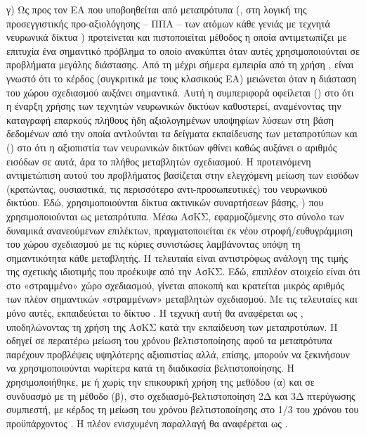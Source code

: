 	γ) Ως προς τον ΕΑ που υποβοηθείται από μεταπρότυπα (, στη λογική της προσεγγιστικής προ-αξιολόγησης – ΠΠΑ – των ατόμων κάθε γενιάς με τεχνητά νευρωνικά δίκτυα \cite{LTT_2_018,LTT_2_020,LTT_2_029}) προτείνεται και πιστοποιείται μέθοδος η οποία αντιμετωπίζει με επιτυχία ένα σημαντικό πρόβλημα το οποίο ανακύπτει όταν αυτές χρησιμοποιούνται σε προβλήματα μεγάλης διάστασης. Από τη μέχρι σήμερα εμπειρία από τη χρήση , είναι γνωστό ότι το κέρδος (συγκριτικά με τους κλασικούς ΕΑ) μειώνεται όταν η διάσταση του χώρου σχεδιασμού αυξάνει σημαντικά. Αυτή η συμπεριφορά οφείλεται () στο ότι η έναρξη χρήσης των τεχνητών νευρωνικών δικτύων καθυστερεί, αναμένοντας την καταγραφή επαρκούς πλήθους ήδη αξιολογημένων υποψηφίων λύσεων στη βάση δεδομένων από την οποία αντλούνται τα δείγματα εκπαίδευσης των μεταπροτύπων και () στο ότι η αξιοπιστία των νευρωνικών δικτύων φθίνει καθώς αυξάνει ο αριθμός εισόδων σε αυτά, άρα το πλήθος μεταβλητών σχεδιασμού. Η προτεινόμενη αντιμετώπιση αυτού του προβλήματος βασίζεται στην ελεγχόμενη μείωση των εισόδων (κρατώντας, ουσιαστικά, τις περισσότερο αντι-προσωπευτικές) του νευρωνικού δικτύου. Εδώ, χρησιμοποιούνται δίκτυα ακτινικών συναρτήσεων βάσης, \cite{Haykin}) που χρησιμοποιούνται  ως μεταπρότυπα.  Μέσω ΑσΚΣ, εφαρμοζόμενης στο σύνολο των δυναμικά ανανεούμενων επιλέκτων, πραγματοποιείται εκ νέου στροφή/ευθυγράμμιση του χώρου σχεδιασμού με τις κύριες συνιστώσες λαμβάνοντας υπόψη τη σημαντικότητα κάθε μεταβλητής. Η τελευταία είναι αντιστρόφως ανάλογη της τιμής της σχετικής ιδιοτιμής που προέκυψε από την ΑσΚΣ. Εδώ, επιπλέον στοιχείο είναι ότι στο «στραμμένο» χώρο σχεδιασμού, γίνεται αποκοπή και κρατείται μικρός αριθμός των πλέον σημαντικών «στραμμένων» μεταβλητών σχεδιασμού. Με τις τελευταίες και μόνο αυτές, εκπαιδεύεται το δίκτυο . Η τεχνική αυτή θα αναφέρεται ως , υποδηλώνοντας τη χρήση της ΑσΚΣ κατά την εκπαίδευση των μεταπροτύπων. Η  οδηγεί σε περαιτέρω μείωση του χρόνου βελτιστοποίησης αφού τα μεταπρότυπα παρέχουν προβλέψεις υψηλότερης αξιοπιστίας αλλά, επίσης, μπορούν να  ξεκινήσουν να χρησιμοποιούνται νωρίτερα κατά τη διαδικασία βελτιστοποίησης. Η  χρησιμοποιήθηκε, με ή χωρίς την επικουρική χρήση της μεθόδου (α) και σε συνδυασμό με τη μέθοδο (β), στο σχεδιασμό-βελτιστοποίηση 2Δ και 3Δ πτερύγωσης συμπιεστή, με κέρδος τη μείωση του χρόνου βελτιστοποίησης στο 1/3 του χρόνου του προϋπάρχοντος  . Η πλέον ενισχυμένη παραλλαγή θα αναφέρεται ως .
	       
